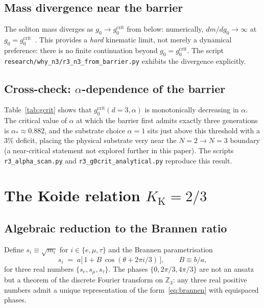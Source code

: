 \documentclass[11pt,a4paper]{article}
\newcommand{\gcrit}{g_{0}^{\mathrm{crit}}}
\newcommand{\Kkoide}{K_{\mathrm{K}}}
\newcommand{\Zthree}{\mathbb{Z}_{3}}
\begin{document}
\subsection{Mass divergence near the barrier}

The soliton mass diverges as $g_{0}\to \gcrit$ from below:
numerically, $dm/dg_{0}\to\infty$ at $g_{0}=\gcrit$~\cite{TGP-repo}.
This provides a \emph{hard} kinematic limit, not merely a dynamical
preference: there is no finite continuation beyond $g_{0}=\gcrit$. The
script
\verb|research/why_n3/r3_n3_from_barrier.py| exhibits the divergence
explicitly.

\subsection{Cross-check: $\alpha$-dependence of the barrier}

Table~\ref{tab:gcrit} shows that $\gcrit(d=3,\alpha)$ is monotonically
decreasing in $\alpha$. The critical value of $\alpha$ at which the
barrier first admits exactly three generations is
$\alpha_{\ast}\!\approx\!0.882$, and the substrate choice $\alpha=1$
sits just above this threshold with a $3\%$ deficit, placing the
physical substrate very near the $N=2\to N=3$ boundary (a near-critical
statement not explored further in this paper). The scripts
\verb|r3_alpha_scan.py| and \verb|r3_g0crit_analytical.py| reproduce
this result.

\section{The Koide relation \texorpdfstring{$\Kkoide=2/3$}{K=2/3}}\label{sec:koide}

\subsection{Algebraic reduction to the Brannen ratio}

Define $s_{i}\equiv\sqrt{m_{i}}$ for $i\in\{e,\mu,\tau\}$ and the
Brannen parametrisation~\cite{Brannen2006}
\begin{equation}\label{eq:brannen}
  s_{i} \;=\; a\bigl[\,1 + B\,\cos(\theta + 2\pi i/3)\,\bigr],
  \qquad B\equiv b/a,
\end{equation}
for three real numbers $\{s_{e},s_{\mu},s_{\tau}\}$. The phases
$\{0,2\pi/3,4\pi/3\}$ are not an ansatz but a theorem of the
discrete Fourier transform on $\Zthree$: any three real positive
numbers admit a unique representation of the form~\eqref{eq:brannen}
with equispaced phases.
\end{document}
